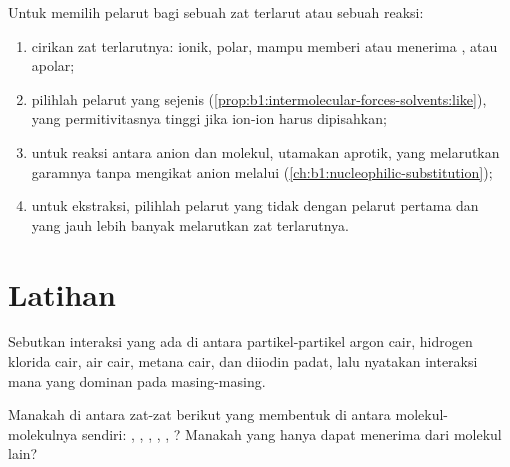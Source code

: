 \begin{method}\label{met:b1:intermolecular-forces-solvents:choose}
Untuk memilih pelarut bagi sebuah zat terlarut atau sebuah reaksi:
\begin{enumerate}
  \item cirikan zat terlarutnya: ionik, polar, mampu memberi atau menerima
        , atau apolar;
  \item pilihlah pelarut yang sejenis (\cref{prop:b1:intermolecular-forces-solvents:like}),
        yang permitivitasnya tinggi jika ion-ion harus dipisahkan;
  \item untuk reaksi antara anion dan molekul, utamakan 
        aprotik, yang melarutkan garamnya tanpa mengikat anion melalui
         (\cref{ch:b1:nucleophilic-substitution});
  \item untuk ekstraksi, pilihlah pelarut yang tidak 
        dengan pelarut pertama dan yang jauh lebih banyak melarutkan zat
        terlarutnya.
\end{enumerate}
\end{method}

\section{Latihan}

\begin{exercise}[$\star$]\label{exo:b1:intermolecular-forces-solvents:1}
Sebutkan interaksi yang ada di antara partikel-partikel argon cair,
hidrogen klorida cair, air cair, metana cair, dan diiodin padat, lalu
nyatakan interaksi mana yang dominan pada masing-masing.
\end{exercise}

\begin{exercise}[$\star$]\label{exo:b1:intermolecular-forces-solvents:2}
Manakah di antara zat-zat berikut yang membentuk  di
antara molekul-molekulnya sendiri: , ,
, , , ? Manakah yang hanya dapat
menerima  dari molekul lain?
\end{exercise}

